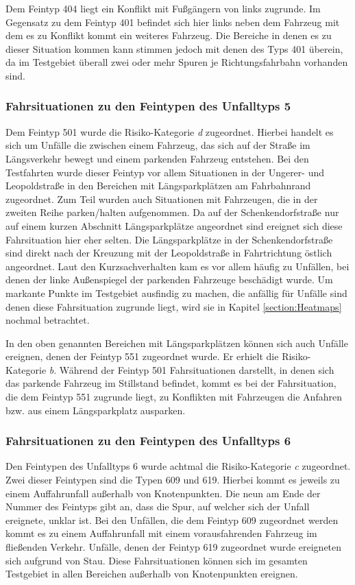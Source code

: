 Dem Feintyp 404 liegt ein Konflikt mit Fußgängern von links zugrunde. Im Gegensatz zu dem Feintyp 401 befindet sich hier links neben dem Fahrzeug mit dem es zu Konflikt kommt ein weiteres Fahrzeug. Die Bereiche in denen es zu dieser Situation kommen kann stimmen jedoch mit denen des Typs 401 überein, da im Testgebiet überall zwei oder mehr Spuren je Richtungsfahrbahn vorhanden sind. 

\subsubsection{Fahrsituationen zu den Feintypen des Unfalltyps 5}
Dem Feintyp 501 wurde die Risiko-Kategorie \textit{d} zugeordnet. Hierbei handelt es sich um Unfälle die zwischen einem Fahrzeug, das sich auf der Straße im Längsverkehr bewegt und einem parkenden Fahrzeug entstehen. Bei den Testfahrten wurde dieser Feintyp vor allem Situationen in der Ungerer- und Leopoldstraße in den Bereichen mit Längsparkplätzen am Fahrbahnrand zugeordnet.  Zum Teil wurden auch Situationen mit Fahrzeugen, die in der zweiten Reihe parken/halten aufgenommen. Da auf der Schenkendorfstraße nur auf einem kurzen Abschnitt Längsparkplätze angeordnet sind ereignet sich diese Fahrsituation hier eher selten. Die Längsparkplätze in der Schenkendorfstraße sind direkt nach der Kreuzung mit der Leopoldstraße in Fahrtrichtung östlich angeordnet. Laut den Kurzsachverhalten kam es vor allem häufig zu Unfällen, bei denen der linke Außenspiegel der parkenden Fahrzeuge beschädigt wurde. Um markante Punkte im Testgebiet ausfindig zu machen, die anfällig für Unfälle sind denen diese Fahrsituation zugrunde liegt, wird sie in Kapitel \ref{section:Heatmaps} nochmal betrachtet.

In den oben genannten Bereichen mit Längsparkplätzen können sich auch Unfälle ereignen, denen der Feintyp 551 zugeordnet wurde. Er erhielt die Risiko-Kategorie \textit{b}. Während der Feintyp 501 Fahrsituationen darstellt, in denen sich das parkende Fahrzeug im Stillstand befindet, kommt es bei der Fahrsituation, die dem Feintyp 551 zugrunde liegt, zu Konflikten mit Fahrzeugen die Anfahren bzw. aus einem Längsparkplatz ausparken.

\subsubsection{Fahrsituationen zu den Feintypen des Unfalltyps 6}
Den Feintypen des Unfalltyps 6 wurde achtmal die Risiko-Kategorie \textit{c} zugeordnet. Zwei dieser Feintypen sind die Typen 609 und 619. Hierbei kommt es jeweils zu einem Auffahrunfall außerhalb von Knotenpunkten. Die neun am Ende der Nummer des Feintyps gibt an, dass die Spur, auf welcher sich der Unfall ereignete, unklar ist. Bei den Unfällen, die dem Feintyp 609 zugeordnet werden kommt es zu einem Auffahrunfall mit einem vorausfahrenden Fahrzeug im fließenden Verkehr. Unfälle, denen der Feintyp 619 zugeordnet wurde ereigneten sich aufgrund von Stau. Diese Fahrsituationen können sich im gesamten Testgebiet in allen Bereichen außerhalb von Knotenpunkten ereignen.

